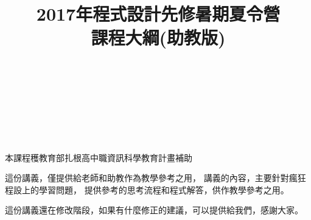 \documentclass[a4paper,12pt]{article}
\title{2017年程式設計先修暑期夏令營\\課程大綱(助教版)}
\begin{document}
\maketitle
%
\ \\ \\ \\ \\ \\
\begin{center}
	本課程穫教育部扎根高中職資訊科學教育計畫補助
\end{center} 
\newpage
這份講義，僅提供給老師和助教作為教學參考之用，
講義的內容，主要針對瘋狂程設上的學習問題，
提供參考的思考流程和程式解答，供作教學參考之用。

這份講義還在修改階段，如果有什麼修正的建議，可以提供給我們，感謝大家。

\newpage
\setcounter{tocdepth}{2}
\tableofcontents







\end{document}
